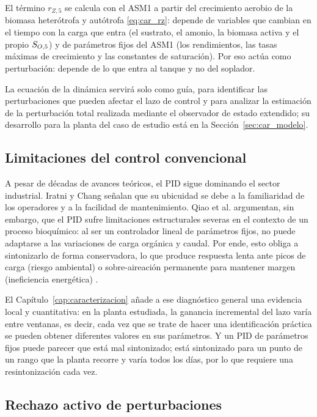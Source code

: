 El término $r_{Z,5}$ se calcula con el ASM1 a partir del crecimiento aerobio de la biomasa heterótrofa
y autótrofa \eqref{eq:car_rz}: depende de variables que cambian en el tiempo con la carga que entra
(el sustrato, el amonio, la biomasa activa y el propio $S_{O,5}$) y de parámetros fijos del ASM1 (los
rendimientos, las tasas máximas de crecimiento y las constantes de saturación). Por eso actúa como
perturbación: depende de lo que entra al tanque y no del soplador.

La ecuación de la dinámica servirá solo como guía, para identificar las perturbaciones que pueden
afectar el lazo de control y para analizar la estimación de la perturbación total realizada mediante el
observador de estado extendido; su desarrollo para la planta del caso de estudio está en la
Sección~\ref{sec:car_modelo}.

\subsection{Limitaciones del control convencional}

A pesar de décadas de avances teóricos, el PID sigue dominando el sector
industrial. Iratni y Chang \cite{iratni2019advances} señalan que su
ubicuidad se debe a la familiaridad de los operadores y a la facilidad de
mantenimiento. Qiao et al. \cite{qiao2016self} argumentan, sin embargo, que el
PID sufre limitaciones estructurales severas en el contexto de un proceso bioquímico: al ser un
controlador lineal de parámetros fijos, no puede adaptarse a las variaciones
de carga orgánica y caudal. Por ende, esto obliga a sintonizarlo de forma conservadora,
lo que produce respuesta lenta ante picos de carga (riesgo ambiental) o
sobre-aireación permanente para mantener margen (ineficiencia energética)
\cite{wei2020disturbance}.

El Capítulo~\ref{cap:caracterizacion} añade a ese diagnóstico general una
evidencia local y cuantitativa: en la planta estudiada, la ganancia incremental
del lazo varía entre ventanas, es decir, cada vez que se trate de hacer una identificación
práctica se pueden obtener diferentes valores en sus parámetros. Y un PID de
parámetros fijos puede parecer que está mal sintonizado; está sintonizado para un punto de un
rango que la planta recorre y varía todos los días, por lo que requiere una resintonización cada vez.



\subsection{Rechazo activo de perturbaciones}

